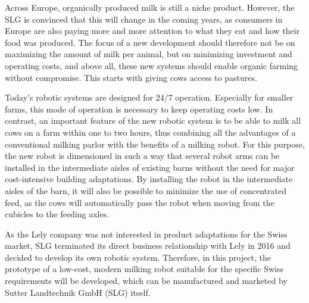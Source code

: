 Across Europe, organically produced milk is still a niche product. However, the SLG is convinced that this will change in the coming years, as consumers in Europe are also paying more and more attention to what they eat and how their food was produced. The focus of a new development should therefore not be on maximizing the amount of milk per animal, but on minimizing investment and operating costs, and above all, these new systems should enable organic farming without compromise. This starts with giving cows access to pastures.

Today's robotic systems are designed for 24/7 operation. Especially for smaller farms, this mode of operation is necessary to keep operating costs low. In contrast, an important feature of the new robotic system is to be able to milk all cows on a farm within one to two hours, thus combining all the advantages of a conventional milking parlor with the benefits of a milking robot. For this purpose, the new robot is dimensioned in such a way that several robot arms can be installed in the intermediate aisles of existing barns without the need for major cost-intensive building adaptations. By installing the robot in the intermediate aisles of the barn, it will also be possible to minimize the use of concentrated feed, as the cows will automatically pass the robot when moving from the cubicles to the feeding axles.

As the Lely company was not interested in product adaptations for the Swiss market, SLG terminated its direct business relationship with Lely in 2016 and decided to develop its own robotic system. Therefore, in this project, the prototype of a low-cost, modern milking robot suitable for the specific Swiss requirements will be developed, which can be manufactured and marketed by Sutter Landtechnik GmbH (SLG) itself.


